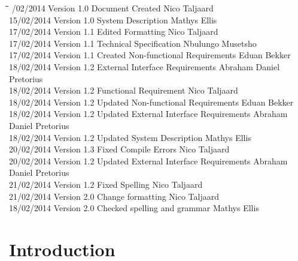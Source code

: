 \documentclass[12pt]{article}
\begin{document}
		\begin{tabbing}
			\hspace*{2.5cm}\=\hspace*{2.5cm}\=\hspace*{8cm}\=\hspace*{3cm} /02/2014 \> Version 1.0 \> Document Created \> Nico Taljaard \\
			15/02/2014 \> Version 1.0 \> System Description \> Mathys Ellis \\
			17/02/2014 \> Version 1.1 \> Edited Formatting \> Nico Taljaard \\
			17/02/2014 \> Version 1.1 \> Technical Specification \> Nbulungo Musetsho \\
			17/02/2014 \> Version 1.1 \> Created Non-functional Requirements \> Eduan Bekker \\
			18/02/2014 \> Version 1.2 \> External Interface Requirements \> Abraham Daniel Pretorius  \\
			18/02/2014 \> Version 1.2 \> Functional Requirement \> Nico Taljaard \\
			18/02/2014 \> Version 1.2 \> Updated Non-functional Requirements \> Eduan Bekker \\
			18/02/2014 \> Version 1.2 \> Updated External Interface Requirements \> Abraham Daniel Pretorius  \\
			18/02/2014 \> Version 1.2 \> Updated System Description \> Mathys Ellis \\
			20/02/2014 \> Version 1.3 \> Fixed Compile Errors \> Nico Taljaard \\
			20/02/2014 \> Version 1.2 \> Updated External Interface Requirements \> Abraham Daniel Pretorius  \\
			21/02/2014 \> Version 1.2 \> Fixed Spelling \> Nico Taljaard \\
			21/02/2014 \> Version 2.0 \> Change formatting \> Nico Taljaard \\
			18/02/2014 \> Version 2.0 \> Checked spelling and grammar \> Mathys Ellis \\
		\end{tabbing}
	
	\newpage
		\tableofcontents	
		
	\newpage
	\section{Introduction}
	
	\vspace{0.2in}
\end{document}
